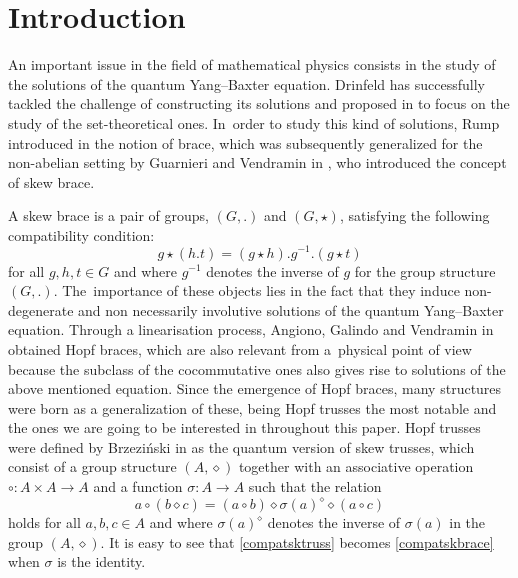 \documentclass[pdftex]{sigma}
\numberwithin{equation}{section}
\begin{document}

\section{Introduction}

An important issue in the field of mathematical physics consists in the study of the solutions of the quantum Yang--Baxter equation. Drinfeld has successfully tackled the challenge of constructing its solutions and proposed in \cite{DR1} to focus on the study of the set-theoretical ones. In~order to study this kind of solutions, Rump introduced in \cite{Rump} the notion of brace, which was subsequently generalized for the non-abelian setting by Guarnieri and Vendramin in \cite{GV}, who introduced the concept of skew brace.

A skew brace is a pair of groups, $(G,.)$ and $(G,\star)$, satisfying the following compatibility condition:
\begin{equation}\label{compatskbrace}
g\star(h. t)=(g\star h). g^{-1}. (g\star t)
\end{equation}
for all $g,h,t\in G$ and where $g^{-1}$ denotes the inverse of $g$ for the group structure $(G,.)$. The~importance of these objects lies in the fact that they induce non-degenerate and non necessarily involutive solutions of the quantum Yang--Baxter equation. Through a linearisation process, Angiono, Galindo and Vendramin in \cite{AGV} obtained Hopf braces, which are also relevant from a~physical point of view because the subclass of the cocommutative ones also gives rise to solutions of the above mentioned equation. Since the emergence of Hopf braces, many structures were born as a generalization of these, being Hopf trusses the most notable and the ones we are going to be interested in throughout this paper. Hopf trusses were defined by Brzezi\'nski in \cite{BRZ1} as the quantum version of skew trusses, which consist of a group structure $(A,\diamond)$ together with an associative operation $\circ\colon A\times A\rightarrow A$ and a function $\sigma\colon A\rightarrow A$ such that the relation
\begin{equation}\label{compatsktruss}
a\circ(b\diamond c)=(a\circ b)\diamond \sigma(a)^{\diamond}\diamond(a \circ c)
\end{equation}
holds for all $a,b,c\in A$ and where $\sigma(a)^{\diamond}$ denotes the inverse of $\sigma(a)$ in the group $(A,\diamond)$. It is easy to see that \eqref{compatsktruss} becomes \eqref{compatskbrace} when $\sigma$ is the identity.
\end{document}
